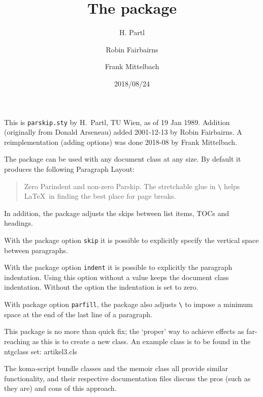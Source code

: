 \documentclass[pagesize=auto, fontsize=14pt, DIV=10, parskip=half]{scrartcl}
\title{The \pkg{parskip} package}
\author{H. Partl\and Robin Fairbairns \and Frank Mittelbach}
\date{2018/08/24}
\makeatletter
\newcommand*{\cls}[1]{\textsf{#1}}
\newcommand*{\cs}[1]{\texttt{\textbackslash#1}}
\newcommand*{\cmd}[1]{\cs{\expandafter\@gobble\string#1}}
\makeatother
\begin{document}
\maketitle

This is \texttt{parskip.sty} by H.~Partl, TU Wien, as of 19 Jan 1989.
Addition (originally from Donald Arseneau) added 2001-12-13 by Robin
Fairbairns. A reimplementation (adding options) was done 2018-08 by Frank Mittelbach.

The package can be used with any document class at any size.
By default it produces the following Paragraph Layout:

\begin{quote}
  Zero Parindent and non-zero Parskip. The stretchable glue in \cmd{\parskip}
  helps \LaTeX\ in finding the best place for page breaks.
\end{quote}

In addition, the package adjusts the skips between list items, TOCs and headings.

With the package option \texttt{skip} it is possible to explicitly
specify the vertical space between paragraphs.

With the package option \texttt{indent} it is possible to explicitly
the paragraph indentation. Using this option without a value keeps the
document class indentation. Without the option the indentation is set
to zero.

With package option \texttt{parfill}, the package also adjusts
\cmd\parfillskip{} to impose a minimum space at the end of
the last line of a paragraph.

This package is no more than quick fix; the `proper' way to achieve
effects as far-reaching as this is to create a new class.  An
example class is to be found in the \cls{ntgclass} set:
\cls{artikel3.cls}

The \cls{koma-script} bundle classes and the \cls{memoir} class all
provide similar functionality, and their respective documentation
files discuss the pros (such as they are) and cons of this approach.
\end{document}
